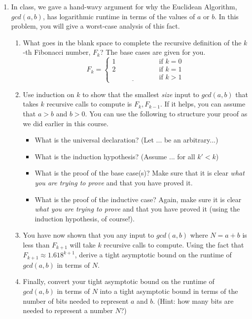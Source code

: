 \documentclass[11pt]{article}
\begin{document}

\begin{enumerate}


\item In class, we gave a hand-wavy argument for why the Euclidean Algorithm, $gcd(a,b)$, has logarithmic runtime in terms of the values of $a$ or $b$.
In this problem, you will give a worst-case analysis of this fact.

\begin{enumerate}
	\item What goes in the blank space to complete the recursive definition of the $k$-th Fibonacci number, $F_k$? The base cases are given for you.
\[
F_k =
\begin{cases}
1 & \text{if } k = 0 \\
2 & \text{if } k = 1 \\
\underline{\hspace{1in}} & \text{if } k > 1
\end{cases}
\]


\item Use induction on $k$ to show that the smallest \emph{size} input to $gcd(a,b)$
that takes $k$ recursive calls to compute is $F_k, F_{k-1}$. If it helps,
you can assume that $a > b$ and $b > 0$. You can use the following to structure your proof
as we did earlier in this course.

\begin{itemize}
    \item What is the universal declaration? (Let ... be an arbitrary...)
    \item What is the induction hypothesis? (Assume ... for all $k' < k$)
    \item What is the proof of the base case(s)? Make sure that it is clear
    \emph{what you are trying to prove} and that you have proved it.
    \item What is the proof of the inductive case? Again, make sure it is clear
    \emph{what you are trying to prove} and that you have proved it (using the induction hypothesis, of course!).
    
\end{itemize}

\item You have now shown that you 
any input to $gcd(a,b)$ where $N=a+b$ is less than $F_{k+1}$ 
will take $k$ recursive calls to compute. 
Using the fact that $F_{k+1} \approx 1.618^{k+1}$, derive a tight asymptotic
bound on the runtime of $gcd(a,b)$ in terms of $N$.

\item Finally, convert your tight asymptotic bound on the runtime of $gcd(a,b)$
in terms of $N$ into a tight asymptotic bound in terms of the number of bits
needed to represent $a$ and $b$. (Hint: how many bits are needed to represent a
number $N$?)
\end{enumerate}

\end{enumerate}
\end{document}
